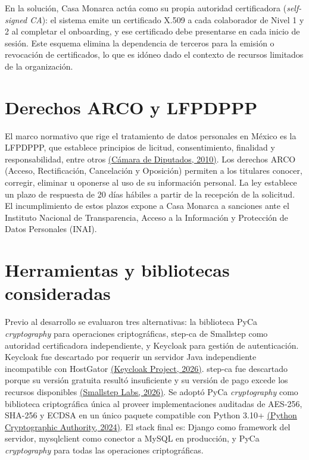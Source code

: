 \documentclass[10pt,letterpaper]{report}
\newcommand{\citeref}[2]{\hyperlink{ref:#1}{(#2)}}
\begin{document}
En la solución, Casa Monarca actúa como su propia autoridad certificadora (\textit{self-signed CA}): el sistema emite un certificado X.509 a cada colaborador de Nivel 1 y 2 al completar el onboarding, y ese certificado debe presentarse en cada inicio de sesión. Este esquema elimina la dependencia de terceros para la emisión o revocación de certificados, lo que es idóneo dado el contexto de recursos limitados de la organización.

\section{Derechos ARCO y LFPDPPP}

El marco normativo que rige el tratamiento de datos personales en México es la LFPDPPP, que establece principios de licitud, consentimiento, finalidad y responsabilidad, entre otros \citeref{camara2010}{Cámara de Diputados, 2010}. Los derechos ARCO (Acceso, Rectificación, Cancelación y Oposición) permiten a los titulares conocer, corregir, eliminar u oponerse al uso de su información personal. La ley establece un plazo de respuesta de 20 días hábiles a partir de la recepción de la solicitud. El incumplimiento de estos plazos expone a Casa Monarca a sanciones ante el Instituto Nacional de Transparencia, Acceso a la Información y Protección de Datos Personales (INAI).

\section{Herramientas y bibliotecas consideradas}

Previo al desarrollo se evaluaron tres alternativas: la biblioteca PyCa \textit{cryptography} para operaciones criptográficas, step-ca de Smallstep como autoridad certificadora independiente, y Keycloak para gestión de autenticación. Keycloak fue descartado por requerir un servidor Java independiente incompatible con HostGator \citeref{keycloak2026}{Keycloak Project, 2026}. step-ca fue descartado porque su versión gratuita resultó insuficiente y su versión de pago excede los recursos disponibles \citeref{smallstep2026}{Smallstep Labs, 2026}. Se adoptó PyCa \textit{cryptography} como biblioteca criptográfica única al proveer implementaciones auditadas de AES-256, SHA-256 y ECDSA en un único paquete compatible con Python 3.10+ \citeref{pyca2024}{Python Cryptographic Authority, 2024}. El stack final es: Django como framework del servidor, mysqlclient como conector a MySQL en producción, y PyCa \textit{cryptography} para todas las operaciones criptográficas.
\end{document}
